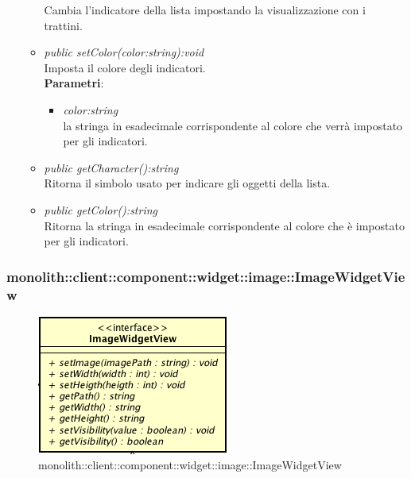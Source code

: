 \begin{itemize}
\begin{itemize}
	Cambia l'indicatore della lista impostando la visualizzazione con i trattini.
	\item \textit{public setColor(color:string):void}\\
	Imposta il colore degli indicatori.
		\\ \textbf{Parametri}: \begin{itemize}
		\item \textit{color:string}\\
		la stringa in esadecimale corrispondente al colore che verrà impostato per gli indicatori.
		\end{itemize} 
	\item \textit{public getCharacter():string}\\
	Ritorna il simbolo usato per indicare gli oggetti della lista.
	\item \textit{public getColor():string}\\
	Ritorna la stringa in esadecimale corrispondente al colore che è impostato per gli indicatori.
	\end{itemize}
\end{itemize}

\subsubsection{monolith::client::component::widget::image::ImageWidgetView}

\label{monolith::client::component::widget::image::ImageWidgetView}
\begin{figure}[H]
	\centering
	\includegraphics[scale=0.5]{Sezioni/SottosezioniST/img/ImageWidgetView.png}
	\caption{monolith::client::component::widget::image::ImageWidgetView}
\end{figure}

